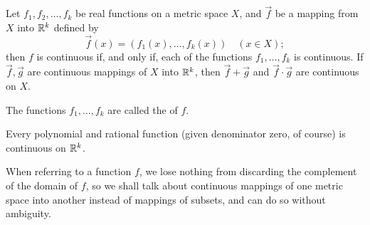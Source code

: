 \documentclass{article}
\begin{document}
\begin{theorem}
    \listhack 
    \begin{enumerate}
        \ii Let $f_{1},f_{2},\dotsc,f_{k}$ be real functions on a metric space $X$, and $\vec{f}$ be a mapping from $X$ into $\mathbb R^{k}$ defined by 
        \[\vec{f}(x)=(f_{1}(x),\dotsc,f_{k}(x))\quad(x\in X);\]then $f$ is continuous if, and only if, each of the functions $f_{1},\dotsc,f_{k}$ is continuous.
        \ii If $\vec{f},\vec{g}$ are continuous mappings of $X$ into $\mathbb R^{k}$, then $\vec{f}+\vec{g}$ and $\vec{f}\cdot \vec{g}$ are continuous on $X$.
    \end{enumerate}
\end{theorem}
\begin{remark}
    \ii The functions $f_{1},\dotsc,f_{k}$ are called the  of $f$.
\end{remark}
\begin{example}
    Every polynomial and rational function (given denominator zero, of course) is continuous on $\mathbb R^{k}$.
\end{example}
\begin{remark}
    When referring to a function $f$, we lose nothing from discarding the complement of the domain of $f$, so we shall talk about continuous mappings of one metric space into another instead of mappings of subsets, and can do so without ambiguity.
\end{remark}
\end{document}
